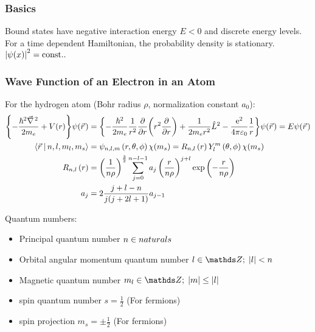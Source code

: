 		\subsubsection{Basics}
			\noindent
			Bound states have negative interaction energy $E<0$ and discrete energy levels. For a time dependent Hamiltonian, the probability density is stationary.
			$\left|\psi(x)\right|^2=\mathrm{const.}.$

		\subsubsection{Wave Function of an Electron in an Atom}
			\noindent
			For the hydrogen atom (Bohr radius $\rho$, normalization constant $a_0$):
			\begin{equation}
				\begin{aligned}
					\qty{-\frac{\hbar^2 \Nabla^2}{2 m_e} + V(r)}\psi(\vec{r})
					&= \qty{-\frac{\hbar^2}{2 m_e}\frac{1}{r^2}\pdv{r}\qty(r^2\pdv{r}) + \frac{1}{2 m_e r^2} \hat{L}^2 - \frac{\ex^2}{4\pi\varepsilon_0}\frac{1}{r}}\psi(\vec{r})
					= E \psi\qty(\vec{r})
					\\
					\Braket{\vec{r}|n,l,m_l,m_s} &= \psi_{n,l,m}\left(r,\theta,\phi\right)\chi(m_s)
					= R_{n,l}\left(r\right) Y_l^m\left(\theta,\phi\right)\chi(m_s) \\
					R_{n,l}\left(r\right)
					&= \left(\frac{1}{n\rho}\right)^{\frac{3}{2}}
					\sum_{j=0}^{n-l-1} a_j \left(\frac{r}{n\rho}\right)^{j+l} \exp\left({-\frac{r}{n\rho}}\right) \\
					a_j &= 2\frac{j+l-n}{j(j+2l+1)} a_{j-1} \\
				\end{aligned}
			\end{equation}

			\noindent
			Quantum numbers:
			\begin{itemize}
				\item Principal quantum number $n \in \\naturals $
				\item Orbital angular momentum quantum number $l \in \integers;\; \left|l\right| < n$
				\item Magnetic quantum number $m_l \in \integers;\; \left|m\right| \le \left|l\right|$
				\item spin quantum number $s = \frac{1}{2}$ (For fermions)
				\item spin projection $m_s = \pm \frac{1}{2}$ (For fermions)
			\end{itemize}

